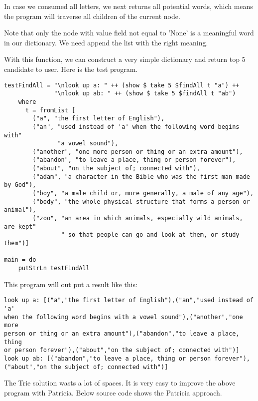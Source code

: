 \documentclass{article}
\begin{document}
In case we consumed all letters, we next returns all potential words, which
means the program will traverse all children of the current node.

Note that only the node with value field not equal to 'None' is a meaningful
word in our dictionary. We need append the list with the right meaning.

With this function, we can construct a very simple dictionary and return
top 5 candidate to user. Here is the test program.

\begin{lstlisting}
testFindAll = "\nlook up a: " ++ (show $ take 5 $findAll t "a") ++
              "\nlook up ab: " ++ (show $ take 5 $findAll t "ab")
    where 
      t = fromList [
        ("a", "the first letter of English"), 
        ("an", "used instead of 'a' when the following word begins with" 
               "a vowel sound"), 
        ("another", "one more person or thing or an extra amount"), 
        ("abandon", "to leave a place, thing or person forever"),
        ("about", "on the subject of; connected with"),
        ("adam", "a character in the Bible who was the first man made by God"),
        ("boy", "a male child or, more generally, a male of any age"), 
        ("body", "the whole physical structure that forms a person or animal"), 
        ("zoo", "an area in which animals, especially wild animals, are kept" 
                " so that people can go and look at them, or study them")]

main = do
    putStrLn testFindAll
\end{lstlisting}

This program will out put a result like this:
\begin{verbatim}
look up a: [("a","the first letter of English"),("an","used instead of 'a' 
when the following word begins with a vowel sound"),("another","one more 
person or thing or an extra amount"),("abandon","to leave a place, thing 
or person forever"),("about","on the subject of; connected with")]
look up ab: [("abandon","to leave a place, thing or person forever"),
("about","on the subject of; connected with")]
\end{verbatim}

The Trie solution wasts a lot of spaces. It is very easy to improve the above
program with Patricia. Below source code shows the Patricia approach.
\end{document}
